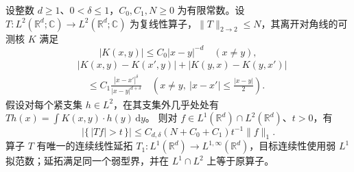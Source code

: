 \begin{theorem}\label{b2:thm:18-cz-weak}
设整数 \(d\geq1\)、\(0<\delta\leq1\)，\(C_0,C_1,N\geq0\) 为有限常数。设 \(T:L^2(\mathbb R^d;\mathbb C)\to L^2(\mathbb R^d;\mathbb C)\) 为复线性算子，\(\|T\|_{2\to2}\leq N\)，其离开对角线的可测核 \(K\) 满足
\[
 |K(x,y)|\leq C_0|x-y|^{-d}\quad(x\ne y),
\]
\[
 \begin{aligned}
 &|K(x,y)-K(x',y)|+|K(y,x)-K(y,x')|\\
 &\quad\leq C_1\frac{|x-x'|^\delta}{|x-y|^{d+\delta}}
 \quad\left(x\ne y,\ |x-x'|\leq\frac{|x-y|}2\right).
 \end{aligned}
\]
假设对每个紧支集 \(h\in L^2\)，在其支集外几乎处处有
\(Th(x)=\int K(x,y)\cdot h(y)\,\mathrm dy\)。
则对 \(f\in L^1(\mathbb R^d)\cap L^2(\mathbb R^d)\)、\(t>0\)，有
\[
 \bigl|\{\,|Tf|>t\,\}\bigr|\leq
 C_{d,\delta}(N+C_0+C_1)t^{-1}\|f\|_1.
\]
算子 \(T\) 有唯一的连续线性延拓
\(T_1:L^1(\mathbb R^d)\to L^{1,\infty}(\mathbb R^d)\)，目标连续性使用弱 \(L^1\) 拟范数；延拓满足同一个弱型界，并在 \(L^1\cap L^2\) 上等于原算子。
\end{theorem}
